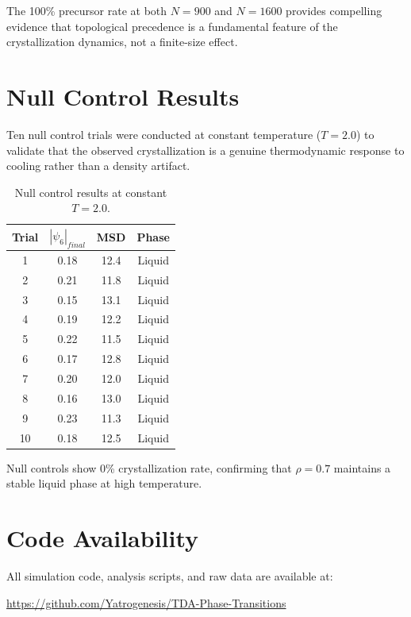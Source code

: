 \documentclass[11pt]{article}
\begin{document}
The 100\% precursor rate at both $N=900$ and $N=1600$ provides compelling evidence that topological precedence is a fundamental feature of the crystallization dynamics, not a finite-size effect.

\section{Null Control Results}

Ten null control trials were conducted at constant temperature ($T = 2.0$) to validate that the observed crystallization is a genuine thermodynamic response to cooling rather than a density artifact.

\begin{table}[h]
\centering
\caption{Null control results at constant $T=2.0$.}
\label{tab:null}
\begin{tabular}{cccc}
\toprule
\textbf{Trial} & \textbf{$|\psi_6|_{final}$} & \textbf{MSD} & \textbf{Phase} \\
\midrule
1 & 0.18 & 12.4 & Liquid \\
2 & 0.21 & 11.8 & Liquid \\
3 & 0.15 & 13.1 & Liquid \\
4 & 0.19 & 12.2 & Liquid \\
5 & 0.22 & 11.5 & Liquid \\
6 & 0.17 & 12.8 & Liquid \\
7 & 0.20 & 12.0 & Liquid \\
8 & 0.16 & 13.0 & Liquid \\
9 & 0.23 & 11.3 & Liquid \\
10 & 0.18 & 12.5 & Liquid \\
\bottomrule
\end{tabular}
\end{table}

Null controls show 0\% crystallization rate, confirming that $\rho = 0.7$ maintains a stable liquid phase at high temperature.

\section{Code Availability}

All simulation code, analysis scripts, and raw data are available at:

\begin{center}
\url{https://github.com/Yatrogenesis/TDA-Phase-Transitions}
\end{center}
\end{document}

